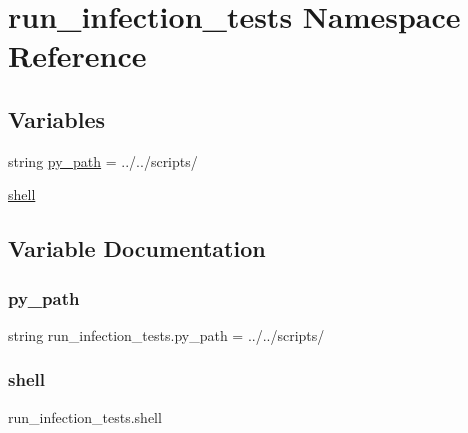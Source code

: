 \hypertarget{namespacerun__infection__tests}{}\section{run\+\_\+infection\+\_\+tests Namespace Reference}
\label{namespacerun__infection__tests}
\subsection*{Variables}
\begin{DoxyCompactItemize}
\item 
string \hyperlink{namespacerun__infection__tests_ac7bc0506daaefd7baa6d4578e526ce65}{py\+\_\+path} = \textquotesingle{}../../scripts/\textquotesingle{}
\item 
\hyperlink{namespacerun__infection__tests_ac8bc65bf177d238b63ddd5b4c6343eab}{shell}
\end{DoxyCompactItemize}


\subsection{Variable Documentation}
\mbox{\label{namespacerun__infection__tests_ac7bc0506daaefd7baa6d4578e526ce65}} 
\subsubsection{\texorpdfstring{py\+\_\+path}{py\_path}}
{\footnotesize\ttfamily string run\+\_\+infection\+\_\+tests.\+py\+\_\+path = \textquotesingle{}../../scripts/\textquotesingle{}}

\mbox{\label{namespacerun__infection__tests_ac8bc65bf177d238b63ddd5b4c6343eab}} 
\subsubsection{\texorpdfstring{shell}{shell}}
{\footnotesize\ttfamily run\+\_\+infection\+\_\+tests.\+shell}

